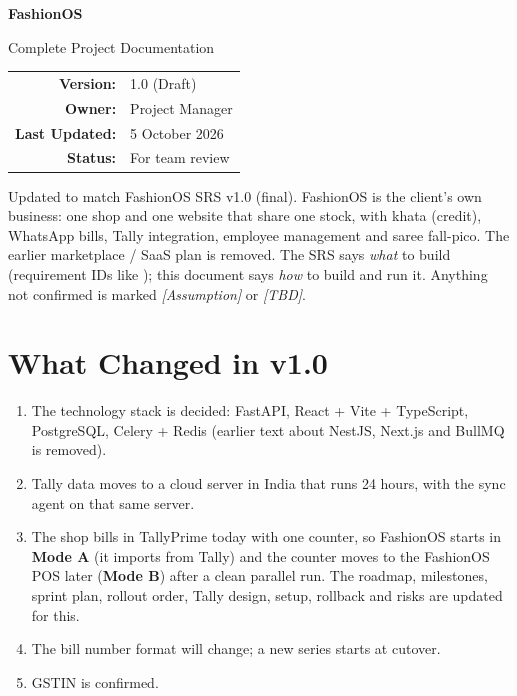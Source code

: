 \documentclass[11pt,a4paper]{article}
\newcommand{\assump}{\textit{[Assumption]}}
\newcommand{\tbd}{\textit{[TBD]}}
\newcommand{\req}[1]{\texttt{\detokenize{#1}}}
\begin{document}
\begin{titlepage}
\centering
\vspace*{3cm}
{\fontsize{30}{36}\selectfont\bfseries FashionOS\par}
\vspace{0.4cm}
{\LARGE Complete Project Documentation\par}
\vspace{1.5cm}
\begin{tabular}{rl}
\textbf{Version:} & 1.0 (Draft) \\
\textbf{Owner:} & Project Manager \\
\textbf{Last Updated:} & 5 October 2026 \\
\textbf{Status:} & For team review \\
\end{tabular}
\vspace{2cm}

\begin{tcolorbox}[colback=hdrgray,colframe=accent,boxrule=0.6pt,width=0.9\textwidth,left=8pt,right=8pt]
\raggedright
Updated to match FashionOS SRS v1.0 (final). FashionOS is the client's own business: one shop and one website that share one stock, with khata (credit), WhatsApp bills, Tally integration, employee management and saree fall-pico. The earlier marketplace / SaaS plan is removed. The SRS says \emph{what} to build (requirement IDs like \req{FR-KHT-02}); this document says \emph{how} to build and run it. Anything not confirmed is marked \assump{} or \tbd{}.
\end{tcolorbox}
\end{titlepage}

\tableofcontents
\newpage

\section*{What Changed in v1.0}
\begin{enumerate}
\item The technology stack is decided: FastAPI, React + Vite + TypeScript, PostgreSQL, Celery + Redis (earlier text about NestJS, Next.js and BullMQ is removed).
\item Tally data moves to a cloud server in India that runs 24 hours, with the sync agent on that same server.
\item The shop bills in TallyPrime today with one counter, so FashionOS starts in \textbf{Mode A} (it imports from Tally) and the counter moves to the FashionOS POS later (\textbf{Mode B}) after a clean parallel run. The roadmap, milestones, sprint plan, rollout order, Tally design, setup, rollback and risks are updated for this.
\item The bill number format will change; a new series starts at cutover.
\item GSTIN is confirmed.
\end{enumerate}
\end{document}
